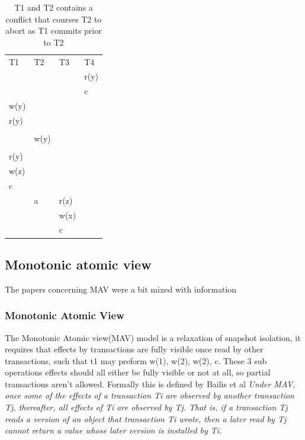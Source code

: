 \documentclass[a4paper,10pt,titlepage]{report}
\begin{document}
    \begin{table}[h]
        \begin{tabular}{l|l|l|l}
            T1   & T2   & T3   & T4   \\
            &      &      & r(y) \\
            &      &      & c    \\
            w(y) &      &      &      \\
            r(y) &      &      &      \\
            &      &      &      \\
            & w(y) &      &      \\
            &      &      &      \\
            r(y) &      &      &      \\
            w(z) &      &      &      \\
            c    &      &      &      \\
            & a    & r(z) &      \\
            &      & w(x) &      \\
            &      & c    &
        \end{tabular}
        \caption{T1 and T2 contains a conflict that courses T2 to abort as T1 commits prior to T2}
    \end{table}

    \subsection{Monotonic atomic view}
    The papers concerning MAV were a bit mixed with information



    \subsubsection{Monotonic Atomic View}
    The Monotonic Atomic view(MAV) model is a relaxation of snapshot isolation, it requires that effects by transactions are fully visible once read by other transactions, such that t1 may preform w(1), w(2), w(2), c. These 3 sub operations effects should all either be fully visible or not at all, so partial transactions aren't allowed. Formally this is defined by Bailis et al \cite{HighlyAvailableTransactionsVirtuesandLimitations}
    \textit{Under MAV, once some of the effects of a transaction Ti are observed by another transaction Tj, thereafter, all effects of Ti are observed by Tj. That is, if a transaction Tj reads a version of an object that transaction Ti wrote, then a later read by Tj cannot return a value whose later version is installed by Ti.}
\end{document}
